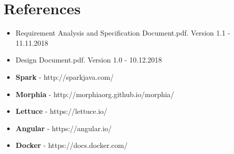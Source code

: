 \documentclass[a4paper, hidelinks, 12pt]{report}
\begin{document}
	\chapter{References}
	\begin{itemize}
		\item Requirement Analysis and Specification Document.pdf. Version 1.1 - 11.11.2018
		\item Design Document.pdf. Version 1.0 - 10.12.2018
		\item \textbf{Spark} - http://sparkjava.com/
		\item \textbf{Morphia} - http://morphiaorg.github.io/morphia/
		\item \textbf{Lettuce} - https://lettuce.io/
		\item \textbf{Angular} - https://angular.io/
		\item \textbf{Docker} - https://docs.docker.com/
		
	\end{itemize}
	
\end{document}
